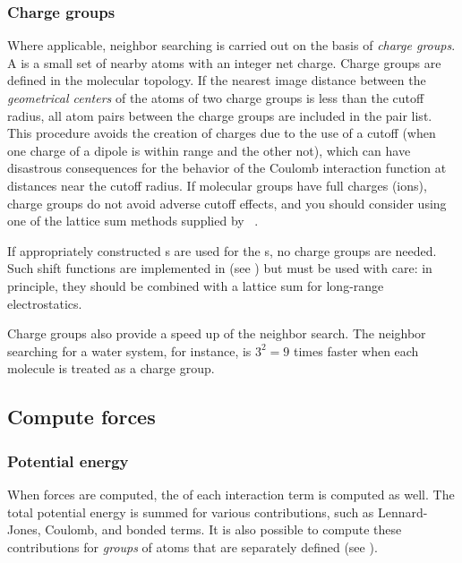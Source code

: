 \subsubsection{Charge groups}
Where applicable, neighbor searching is carried out on the basis of
{\em charge groups}. A  is a small set of
nearby atoms with an integer net charge. Charge groups are defined in
the molecular topology. If the nearest image distance between the {\em
geometrical centers} of the atoms of two charge groups is less than
the cutoff radius, all atom pairs between the charge groups are
included in the pair list. This procedure avoids the creation of
charges due to the use of a cutoff (when one charge of a dipole is
within range and the other not), which can have disastrous
consequences for the behavior of the Coulomb interaction function at
distances near the cutoff radius. If molecular groups have full
charges (ions), charge groups do not avoid adverse cutoff effects,
and you should consider using one of the lattice sum methods supplied
by {\gromacs}~\cite{Berendsen93a}.

If appropriately
constructed s are used for the 
s, no
charge groups are needed. Such shift functions are implemented in
{\gromacs} (see ) but must be used with care: in principle,
they should be combined with a lattice sum for long-range
electrostatics.

Charge groups also provide a speed up of the neighbor search.
The neighbor searching for a water system, for instance,
is $3^2=9$ times faster when each molecule is treated as a charge group.

\subsection{Compute forces}
\label{subsec:forces}

\subsubsection{Potential energy}
When forces are computed, the  of each
interaction term is computed as well. The total potential energy is
summed for various contributions, such as Lennard-Jones, Coulomb, and
bonded terms. It is also possible to compute these contributions for
{\em groups} of atoms that are separately defined (see
).

